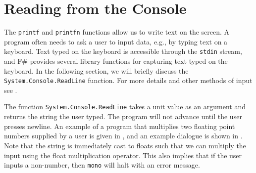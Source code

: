 \documentclass[fsharpnotes.tex]{subfiles}
\begin{document}
\section{Reading from the Console}
\label{sec:readline}
The \lstinline{printf} and \lstinline{printfn} functions allow us to write text on the screen. A program often needs to ask a user to input data, e.g., by typing text on a keyboard. Text typed on the keyboard is accessible through the \lstinline{stdin} stream, and F\# provides several library functions for capturing text typed on the keyboard. In the following section, we will briefly discuss the \lstinline{System.Console.ReadLine} function. For more details and other methods of input see .

The function \lstinline{System.Console.ReadLine} takes a unit value as an argument and returns the string the user typed. The program will not advance until the user presses newline. An example of a program that multiplies two floating point numbers supplied by a user is given in ,
%
%
and an example dialogue is shown in .
%
%
%
Note that the string is immediately cast to floats such that we can multiply the input using the float multiplication operator. This also implies that if the user inputs a non-number, then \lstinline[language=console]{mono} will halt with an error message.
\clearpage
\end{document}
